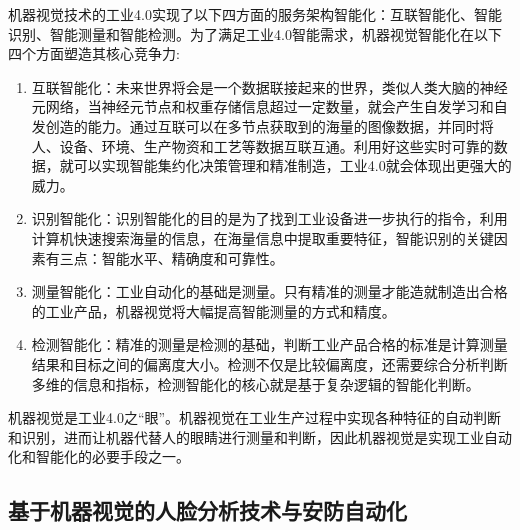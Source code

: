机器视觉技术的工业4.0实现了以下四方面的服务架构智能化：互联智能化、智能识别、智能测量和智能检测\cite{Microvison2016}。为了满足工业4.0智能需求，机器视觉智能化在以下四个方面塑造其核心竞争力\cite{CAA2016}:
\begin{enumerate}[(1)]
\item 互联智能化：未来世界将会是一个数据联接起来的世界，类似人类大脑的神经元网络，当神经元节点和权重存储信息超过一定数量，就会产生自发学习和自发创造的能力。通过互联可以在多节点获取到的海量的图像数据，并同时将人、设备、环境、生产物资和工艺等数据互联互通。利用好这些实时可靠的数据，就可以实现智能集约化决策管理和精准制造，工业4.0就会体现出更强大的威力。

\item 识别智能化：识别智能化的目的是为了找到工业设备进一步执行的指令，利用计算机快速搜索海量的信息，在海量信息中提取重要特征，智能识别的关键因素有三点：智能水平、精确度和可靠性。
\item 测量智能化：工业自动化的基础是测量。只有精准的测量才能造就制造出合格的工业产品，机器视觉将大幅提高智能测量的方式和精度。

\item 检测智能化：精准的测量是检测的基础，判断工业产品合格的标准是计算测量结果和目标之间的偏离度大小。检测不仅是比较偏离度，还需要综合分析判断多维的信息和指标，检测智能化的核心就是基于复杂逻辑的智能化判断。




\end{enumerate}

机器视觉是工业4.0之“眼”。机器视觉在工业生产过程中实现各种特征的自动判断和识别，进而让机器代替人的眼睛进行测量和判断，因此机器视觉是实现工业自动化和智能化的必要手段之一。

\subsection{基于机器视觉的人脸分析技术与安防自动化} 

